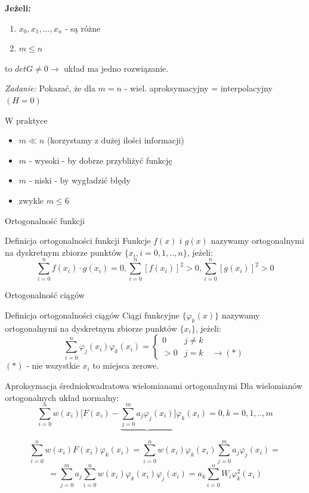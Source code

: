 \begin{frame}
	\textbf{Jeżeli:}
    \begin{enumerate}
    \item $x_0,x_1,\ldots,x_n$ - są różne
    \item $m \leqslant n$
    \end{enumerate}
    to $det G \not= 0 \rightarrow$ układ ma jedno rozwiązanie. 
    \begin{flushright}
    	\textit{Zadanie: } \quad Pokazać, że dla $m = n$ - wiel. aproksymacyjny = interpolacyjny $(H=0)$
     \end{flushright}
\end{frame}
\begin{frame}{W praktyce}
	\begin{itemize}
	\item $m \ll n$ (korzystamy z dużej ilości informacji)
    \item $m$ - wysoki - by dobrze przybliżyć funkcję
    \item $m$ - niski - by wygładzić błędy
    \item zwykle $m \leqslant 6$
	\end{itemize}
\end{frame}
\begin{frame}{Ortogonalność funkcji}
	\begin{block}{Definicja ortogonalności funkcji}
	Funkcje $f(x)$ i $g(x)$ nazywamy ortogonalnymi na dyskretnym zbiorze punktów $\{x_i,i=0,1,..,n\}$, jeżeli:
    $$\sum_{i=0}^{n}f(x_i)\cdot g(x_i) = 0, \sum_{i=0}^{n}[f(x_i)]^2 > 0,\sum_{i=0}^{n}[g(x_i)]^2 > 0$$
	\end{block}
\end{frame}
\begin{frame}{Ortogonalność ciągów}
	\begin{block}{Definicja ortogonalności ciągów}
	Ciągi funkcyjne $\{\varphi_k(x)\}$ nazywamy ortogonalnymi na dyskretnym zbiorze punktów $\{x_i\}$, jeżeli:
    $$\sum_{i=0}^{n}\varphi_j(x_i)\varphi_k(x_i) = \left\{\begin{array}{cl}
    	0 & j \not= k \\
        >0 & j = k \quad \rightarrow (*)
    \end{array}\right.$$
    $(*)$ - nie wszystkie $x_i$ to miejsca zerowe.
	\end{block}
\end{frame}
\begin{frame}{Aproksymacja średniokwadratowa wielomianami ortogonalnymi}
	Dla wielomianów ortogonalnych układ normalny:
    $$\sum_{i=0}^{n}w(x_i)\Bigg[F(x_i)-\underbrace{\sum_{j=0}^{m}a_j\varphi_j(x_i)}\Bigg]\varphi_k(x_i)=0, k=0,1,..,m$$
    \begin{center}
    	$$\sum_{i=0}^{n}w(x_i)F(x_i)\varphi_k(x_i)=\sum_{i=0}^{n}w(x_i)\varphi_k(x_i)\sum_{j=0}^{m}a_j\varphi_j(x_i)=$$\newline$$=\sum_{j=0}^{m}a_j\sum_{i=0}^{n}w(x_i)\varphi_k(x_i)\varphi_j(x_i) = a_k\sum_{i=0}^{n}W_i\varphi_k^2(x_i)$$
    \end{center}
    
\end{frame}
